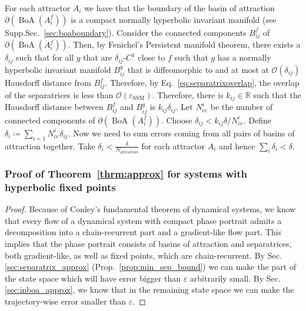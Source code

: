 \documentclass{article}
\theoremstyle{definition} \newtheorem{definition}{Definition}
\theoremstyle{remark} \newtheorem{remark}{Remark}
\newcommand{\reals}{\mathbb{R}}
\newcommand{\boa}{\operatorname{BoA}}
\newcounter{ct}
\begin{document}
For each attractor $A_i$ we have that the boundary of the basin of attraction $\partial(\boa(A_i^f))$ is a compact normally hyperbolic invariant manifold (see Supp.Sec.~\ref{sec:boaboundary}).
Consider the connected components $B^f_{ij}$ of $\partial(\boa(A_i^f))$. %
Then, by Fenichel's Persistent manifold theorem, there exists a $\delta_{ij}$ such that for all $g$ that are $\delta_{ij}$-$C^1$ close to $f$ such that $g$ has a normally hyperbolic invariant manifold  $B^g_{ij}$ that is diffeomorphic to and at most at $\mathcal{O}(\delta_{ij})$ Hausdorff distance from $B^f_{ij}$.
Therefore, by Eq.~\ref{eq:separatrixoverlap}, the overlap of the separatrices is less than $\mathcal{O}(\varepsilon_{\operatorname{SSM}})$. %
Therefore, there is $k_{ij}\in\reals$ such that the Hausdorff distance between $B^f_{ij}$ and $B^g_{ij}$ is $k_{ij}\delta_{ij}$.
Let  $N_{\operatorname{cc}}^i$ be the number of connected components of $\partial(\boa(A_i^f))$.
Choose $\delta_{ij}<k_{ij}\delta/N_{\operatorname{cc}}^i$. 
Define $\delta_i\coloneqq\sum_{i=1}{N_{\operatorname{cc}}^i}\delta_{ij}$.
Now we need to sum errors coming from all pairs of basins of attraction together.
Take $\delta_i< \frac{\delta}{N_{\operatorname{attractors}}}$ for each attractor $A_i$ and hence $\sum_i\delta_i<\delta$.


\subsubsection{Proof of Theorem~\ref{thrm:approx} for systems with hyperbolic fixed points}\label{sec:proof_fp_approx}
\begin{proof}%
Because of Conley's fundamental theorem of dynamical systems\citep{conley1978morse}, we know that every flow of a dynamical system with compact phase portrait admits a decomposition into a chain-recurrent part and a gradient-like flow part.
This implies that the phase portrait consists of basins of attraction and separatrices, both gradient-like, as well as fixed points, which are chain-recurrent.
%
By Sec.\ref{sec:separatrix_approx} (Prop.~\ref{prop:min_sep_bound}) we can make the part of the state space which will have error bigger than $\varepsilon$ arbitrarily small. %
By Sec.\ref{sec:inboa_approx}, we know that in the remaining state space we can make the trajectory-wise error smaller than $\varepsilon$.
\end{proof}
\end{document}

